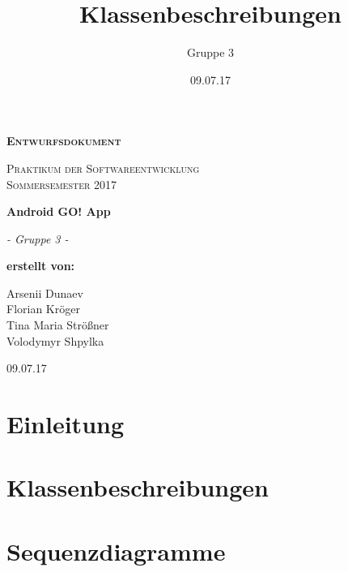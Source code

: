 \documentclass[parskip=full]{scrartcl}
\title{Klassenbeschreibungen}
\author{Gruppe 3}
\date{09.07.17}
\begin{document}
\begin{titlepage}
	\begin{center}
	{\scshape\LARGE \bfseries Entwurfsdokument \par}
	\vspace{1cm}
	{\scshape\Large Praktikum der Softwareentwicklung \\ Sommersemester 2017\par}
	\vspace{1.5cm}
	{\huge\bfseries Android GO! App\par}
	\vspace{2cm}
	{\Large\itshape - Gruppe 3 -\par}
	\vfill
	{\bfseries erstellt von:\par}
	Arsenii Dunaev \\
	Florian Kröger \\
	Tina Maria Strößner \\
	Volodymyr Shpylka \\	
	\vfill
	{\large 09.07.17 \par}	
	\end{center}
\end{titlepage}

\tableofcontents

\newpage


\section{Einleitung}

\section{Klassenbeschreibungen}

\section{Sequenzdiagramme}



\printglossary	
\end{document}
